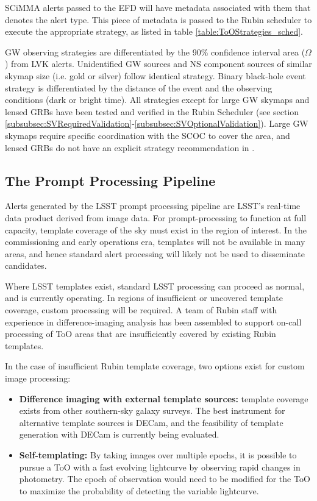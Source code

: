 SCiMMA alerts passed to the EFD will have metadata associated with them that denotes the alert type. This piece of metadata is passed to the Rubin scheduler to execute the appropriate strategy, as listed in table \ref{table:ToOStrategies_sched}.

GW observing strategies are differentiated by the 90\% confidence interval area ($\Omega$) from LVK alerts. Unidentified GW sources and NS component sources of similar skymap size (i.e. gold or silver) follow identical strategy. Binary black-hole event strategy is differentiated by the distance of the event and the observing conditions (dark or bright time). All strategies except for large GW skymaps and lensed GRBs have been tested and verified in the Rubin Scheduler (see section \ref{subsubsec:SVRequiredValidation}-\ref{subsubsec:SVOptionalValidation}). Large GW skymaps require specific coordination with the SCOC to cover the area, and lensed GRBs do not have an explicit strategy recommendation in \citet{RubinToO2024}.

\subsection{The Prompt Processing Pipeline}\label{subsec:PP}

Alerts generated by the LSST prompt processing pipeline are LSST’s real-time data product derived from image data. For prompt-processing to function at full capacity, template coverage of the sky must exist in the region of interest. In the commissioning and early operations era, templates will not be available in many areas, and hence standard alert processing will likely not be used to disseminate candidates.

Where LSST templates exist, standard LSST processing can proceed as normal, and is currently operating. In regions of insufficient or uncovered template coverage, custom processing will be required. A team of Rubin staff with experience in difference-imaging analysis has been assembled to support on-call processing of ToO areas that are insufficiently covered by existing Rubin templates.

In the case of insufficient Rubin template coverage, two options exist for custom image processing:

\begin{itemize}
    \item \textbf{Difference imaging with external template sources:} template coverage exists from other southern-sky galaxy surveys. The best instrument for alternative template sources is DECam, and the feasibility of template generation with DECam is currently being evaluated.
    \item \textbf{Self-templating:} By taking images over multiple epochs, it is possible to pursue a ToO with a fast evolving lightcurve by observing rapid changes in photometry. The epoch of observation would need to be modified for the ToO to maximize the probability of detecting the variable lightcurve.
\end{itemize}


